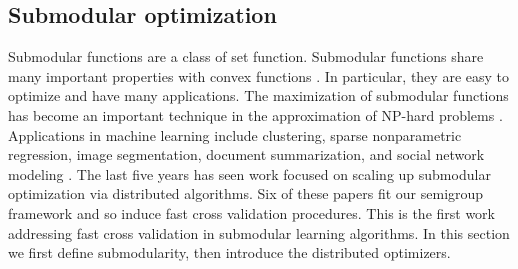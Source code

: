 \documentclass[thesis.tex]{subfiles}
\newcommand{\wpca}{\hat\w^\textit{pca}}
\newcommand{\wlbk}{\hat\w^\textit{lbk}}
\begin{document}

%


\subsection{Submodular optimization}
\label{sec:merge:submodular}

Submodular functions are a class of set function.
Submodular functions share many important properties with convex functions \citep{lovasz1983submodular}.
In particular, they are easy to optimize and have many applications. 
The maximization of submodular functions has become an important technique in the approximation of NP-hard problems \citep{krause14survey}.
Applications in machine learning include clustering, sparse nonparametric regression, image segmentation, document summarization, and social network modeling \citep[see references within][]{mirzasoleiman2016distributed}.
The last five years has seen work focused on scaling up submodular optimization via distributed algorithms.
Six of these papers fit our semigroup framework
\citep{mirzasoleiman2013distributed,barbosa2015power,malkomes2015fast,bhaskara2016greedy,barbosa2016new,mirzasoleiman2016distributed}
and so induce fast cross validation procedures.
This is the first work addressing fast cross validation in submodular learning algorithms.
In this section we first define submodularity,
then introduce the distributed optimizers.
\end{document}
